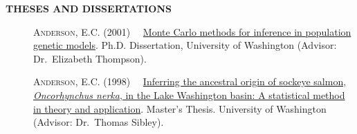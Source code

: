 \documentclass[11pt]{article}
\newlength{\postskip}
\begin{document}
\nocite{*}

\printbibheading
\bibbycategory




\vspace*{\postskip}
{\bf THESES AND DISSERTATIONS}
\begin{description}
\item[] \textsc{Anderson, E.C.} (2001) \ \ \href{http://ib.berkeley.edu/labs/slatkin/eriq/writings/ECA_Dissertation.pdf}{Monte Carlo methods for inference
in population genetic models}.  Ph.D. Dissertation, University of Washington
(Advisor: Dr.~Elizabeth Thompson).
\item[] \textsc{Anderson, E.C.} (1998) \ \ \href{http://ib.berkeley.edu/labs/slatkin/eriq/writings/eric_anderson_ms_thesis.pdf}{Inferring the ancestral origin of 
sockeye salmon, {\em Oncorhynchus nerka}, in the Lake Washington basin:
A statistical method in theory and application}. Master's Thesis. University of Washington
(Advisor: Dr.\ Thomas Sibley).
\end{description}

\vspace*{\postskip}
\end{document}
